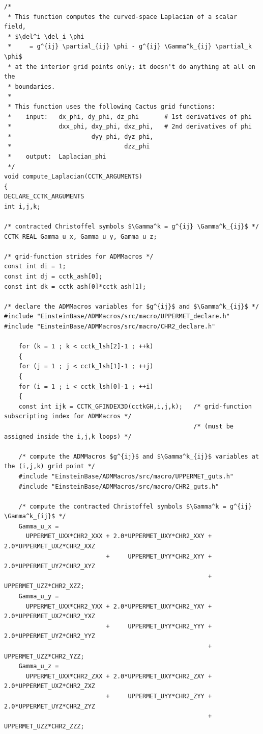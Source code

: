 \newpage	%
\begingroup
\footnotesize
\begin{verbatim}
/*
 * This function computes the curved-space Laplacian of a scalar field,
 * $\del^i \del_i \phi
 *     = g^{ij} \partial_{ij} \phi - g^{ij} \Gamma^k_{ij} \partial_k \phi$
 * at the interior grid points only; it doesn't do anything at all on the
 * boundaries.
 *
 * This function uses the following Cactus grid functions:
 *    input:   dx_phi, dy_phi, dz_phi       # 1st derivatives of phi
 *             dxx_phi, dxy_phi, dxz_phi,   # 2nd derivatives of phi
 *                      dyy_phi, dyz_phi,
 *                               dzz_phi
 *    output:  Laplacian_phi
 */
void compute_Laplacian(CCTK_ARGUMENTS)
{
DECLARE_CCTK_ARGUMENTS
int i,j,k;

/* contracted Christoffel symbols $\Gamma^k = g^{ij} \Gamma^k_{ij}$ */
CCTK_REAL Gamma_u_x, Gamma_u_y, Gamma_u_z;

/* grid-function strides for ADMMacros */
const int di = 1;
const int dj = cctk_ash[0];
const int dk = cctk_ash[0]*cctk_ash[1];

/* declare the ADMMacros variables for $g^{ij}$ and $\Gamma^k_{ij}$ */
#include "EinsteinBase/ADMMacros/src/macro/UPPERMET_declare.h"
#include "EinsteinBase/ADMMacros/src/macro/CHR2_declare.h"

    for (k = 1 ; k < cctk_lsh[2]-1 ; ++k)
    {
    for (j = 1 ; j < cctk_lsh[1]-1 ; ++j)
    {
    for (i = 1 ; i < cctk_lsh[0]-1 ; ++i)
    {
    const int ijk = CCTK_GFINDEX3D(cctkGH,i,j,k);   /* grid-function subscripting index for ADMMacros */
                                                    /* (must be assigned inside the i,j,k loops) */

    /* compute the ADMMacros $g^{ij}$ and $\Gamma^k_{ij}$ variables at the (i,j,k) grid point */
    #include "EinsteinBase/ADMMacros/src/macro/UPPERMET_guts.h"
    #include "EinsteinBase/ADMMacros/src/macro/CHR2_guts.h"

    /* compute the contracted Christoffel symbols $\Gamma^k = g^{ij} \Gamma^k_{ij}$ */
    Gamma_u_x =
      UPPERMET_UXX*CHR2_XXX + 2.0*UPPERMET_UXY*CHR2_XXY + 2.0*UPPERMET_UXZ*CHR2_XXZ
                            +     UPPERMET_UYY*CHR2_XYY + 2.0*UPPERMET_UYZ*CHR2_XYZ
                                                        +     UPPERMET_UZZ*CHR2_XZZ;
    Gamma_u_y =
      UPPERMET_UXX*CHR2_YXX + 2.0*UPPERMET_UXY*CHR2_YXY + 2.0*UPPERMET_UXZ*CHR2_YXZ
                            +     UPPERMET_UYY*CHR2_YYY + 2.0*UPPERMET_UYZ*CHR2_YYZ
                                                        +     UPPERMET_UZZ*CHR2_YZZ;
    Gamma_u_z =
      UPPERMET_UXX*CHR2_ZXX + 2.0*UPPERMET_UXY*CHR2_ZXY + 2.0*UPPERMET_UXZ*CHR2_ZXZ
                            +     UPPERMET_UYY*CHR2_ZYY + 2.0*UPPERMET_UYZ*CHR2_ZYZ
                                                        +     UPPERMET_UZZ*CHR2_ZZZ;


\end{verbatim}
